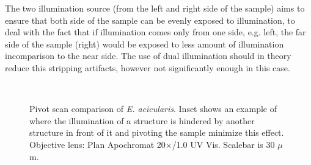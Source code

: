 The two illumination source (from the left and right side of the sample) aims to ensure that both side of the sample can be evenly exposed to illumination, to deal with the fact that if illumination comes only from one side, e.g. left, the far side of the sample (right) would be exposed to less amount of illumination incomparison to the near side. 
The use of dual illumination should in theory reduce this stripping artifacts, however not significantly enough in this case. 

\begin{figure}[h!]
\centering
{}\hspace{.1mm}
\\
\caption{Pivot scan comparison of \textit{E. acicularis}. 
Inset shows an example of where the illumination of a structure is hindered by another structure in front of it and pivoting the sample minimize this effect. 
Objective lens: Plan Apochromat 20$\times$/1.0 UV Vis. 
Scalebar is 30 $\mu$m.}
\label{fig:Elepiv}
\end{figure}

